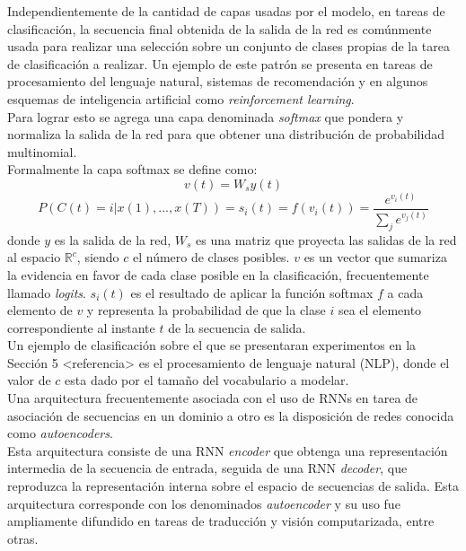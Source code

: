 \documentclass{article}
\begin{document}
	Independientemente de la cantidad de capas usadas por el modelo, en tareas de clasificación, la secuencia final obtenida de la salida de la red es comúnmente usada para realizar una selección sobre un conjunto de clases propias de la tarea de clasificación a realizar. Un ejemplo de este patrón se presenta en tareas de procesamiento del lenguaje natural, sistemas de recomendación y en algunos esquemas de inteligencia artificial como \textit{reinforcement learning}.\\
	Para lograr esto se agrega una capa denominada \textit{softmax} que pondera y normaliza la salida de la red para que obtener una distribución de probabilidad multinomial.\\
	Formalmente la capa softmax se define como:
	\begin{equation*}
	v(t) = W_sy(t)
	\end{equation*}
	\begin{equation*}
	P(C(t) = i | x(1) , ... , x(T))= s_{i}(t) = f(v_i(t)) = \displaystyle\frac{e^{v_{i}(t)}}{\displaystyle\sum_{j} e^{v_{j}(t)}}
	\end{equation*}
	donde $y$ es la salida de la red, $W_s$ es una matriz que proyecta las salidas de la red al espacio $\mathbb{R}^{c}$, siendo $c$ el número de clases posibles. $v$ es un vector que sumariza la evidencia en favor de cada clase posible en la clasificación, frecuentemente llamado \textit{logits}. $s_{i}(t)$ es el resultado de aplicar la función softmax $f$ a cada elemento de $v$ y representa la probabilidad de que la clase $i$ sea el elemento correspondiente al instante $t$ de la secuencia de salida.\\
	Un ejemplo de clasificación sobre el que se presentaran experimentos en la Sección 5 <referencia> es el procesamiento de lenguaje natural (NLP), donde el valor de $c$ esta dado por el tamaño del vocabulario a modelar.\\
	
	Una arquitectura frecuentemente asociada con el uso de RNNs en tarea de asociación de secuencias en un dominio a otro es la disposición de redes conocida como \textit{autoencoders}. \\
	Esta arquitectura consiste de una RNN \textit{encoder} que obtenga una representación intermedia de la secuencia de entrada, seguida de una RNN \textit{decoder}, que reproduzca la representación interna sobre el espacio de secuencias de salida. Esta arquitectura corresponde con los denominados \textit{autoencoder} y su uso fue ampliamente difundido en tareas de traducción\cite{7MachineTranslation} y visión computarizada\cite{8AttentionModels}, entre otras\cite{15TransductionGraves}.\\
	
\end{document}

